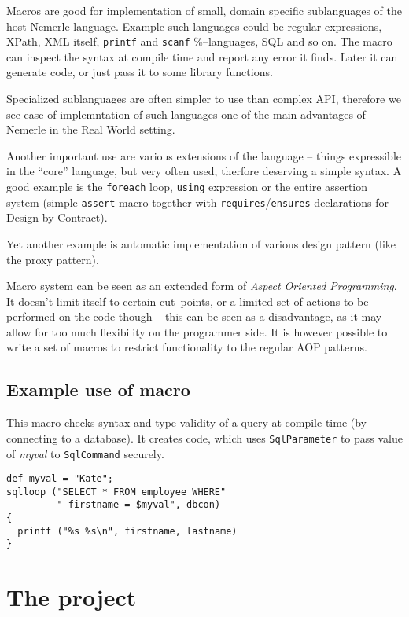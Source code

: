 \documentclass{article}
\begin{document}
Macros are good for implementation of small, domain specific sublanguages
of the host Nemerle language. Example such languages could be
regular expressions, XPath, XML itself, \texttt{printf} and \texttt{scanf}
\%--languages, SQL and so on. The macro can inspect the syntax
at compile time and report any error it finds. Later it can generate code,
or just pass it to some library functions.

Specialized sublanguages are often simpler to use than complex
API, therefore we see ease of implemntation of such languages
one of the main advantages of Nemerle in the Real World setting.

Another important use  are various extensions of the language
-- things expressible in the ``core'' language, but very often
used, therfore deserving a simple syntax. A good example is
the \texttt{foreach} loop, \texttt{using} expression or the
entire assertion system (simple \texttt{assert} macro together
with \texttt{requires}/\texttt{ensures} declarations for
Design by Contract). 

Yet another example is automatic implementation of various
design pattern (like the proxy pattern).

Macro system can be seen as an extended form of 
\textit{Aspect Oriented Programming}. It doesn't limit
itself to certain cut--points, or a limited set of actions
to be performed on the code though -- this can be seen as a 
disadvantage, as it may allow for too much flexibility on
the programmer side. It is however possible to write a set
of macros to restrict functionality to the regular AOP patterns. 

\subsection{Example use of macro}
This macro checks syntax and type validity of a query at compile-time
(by connecting to a database). It creates code, which uses {\tt SqlParameter}
to pass value of {\it myval} to {\tt SqlCommand} securely.

\begin{verbatim}
def myval = "Kate";
sqlloop ("SELECT * FROM employee WHERE"
         " firstname = $myval", dbcon) 
{
  printf ("%s %s\n", firstname, lastname)
}
\end{verbatim}


\section{The project}
\end{document}
